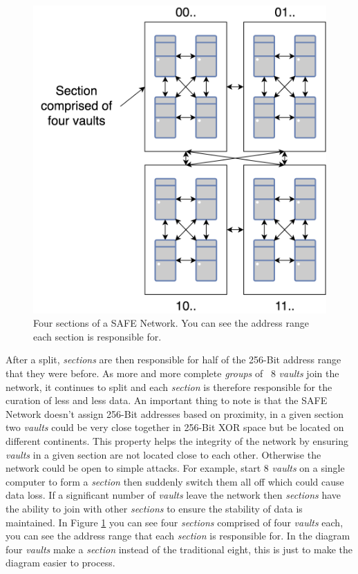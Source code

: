 
\begin{figure}
	\begin{center}
		\includegraphics[scale=0.3]{diagrams/safe-network-sections}
		\caption{Four sections of a SAFE Network. You can see the address range each section is responsible for.}
		\label{fig:safe-sections}
	\end{center}
\end{figure}

After a split, \textit{sections} are then responsible for half of the 256-Bit address range that they were before. As more and more complete \textit{groups} of ~8 \textit{vaults} join the network, it continues to split and each \textit{section} is therefore responsible for the curation of less and less data. An important thing to note is that the SAFE Network doesn't assign 256-Bit addresses based on proximity, in a given section two \textit{vaults} could be very close together in 256-Bit XOR space but be located on different continents. This property helps the integrity of the network by ensuring \textit{vaults} in a given section are not located close to each other. Otherwise the network could be open to simple attacks. For example, start 8 \textit{vaults} on a single computer to form a \textit{section} then suddenly switch them all off which could cause data loss. If a significant number of \textit{vaults} leave the network then \textit{sections} have the ability to join with other \textit{sections} to ensure the stability of data is maintained. In Figure \ref{fig:safe-sections} you can see four \textit{sections} comprised of four \textit{vaults} each, you can see the address range that each \textit{section} is responsible for. In the diagram four \textit{vaults} make a \textit{section} instead of the traditional eight, this is just to make the diagram easier to process.

